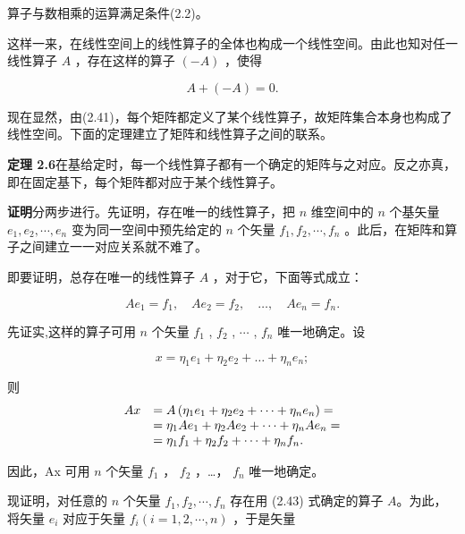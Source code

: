 算子与数相乘的运算满足条件(2.2)。

这样一来，在线性空间上的线性算子的全体也构成一个线性空间。由此也知对任一线性算子 $A$ ，存在这样的算子 $(-A)$ ，使得

\begin{equation*}
A + (- A) = 0.
\end{equation*}

现在显然，由(2.41)，每个矩阵都定义了某个线性算子，故矩阵集合本身也构成了线性空间。下面的定理建立了矩阵和线性算子之间的联系。

\textbf{定理 2.6}\quad 在基给定时，每一个线性算子都有一个确定的矩阵与之对应。反之亦真，即在固定基下，每个矩阵都对应于某个线性算子。

\textbf{证明}\quad 分两步进行。先证明，存在唯一的线性算子，把 $n$ 维空间中的 $n$ 个基矢量 $e_1, e_2, \cdots, e_n$ 变为同一空间中预先给定的 $n$ 个矢量 $f_1, f_2, \cdots, f_n$ 。此后，在矩阵和算子之间建立一一对应关系就不难了。

即要证明，总存在唯一的线性算子 $A$ ，对于它，下面等式成立：

\begin{equation*}
A e _ {1} = f _ {1}, \quad A e _ {2} = f _ {2}, \quad \dots , \quad A e _ {n} = f _ {n}.\tag{2.43}
\end{equation*}

先证实,这样的算子可用 $n$ 个矢量 $f_{1}$ , $f_{2}$ , $\cdots$ , $f_{n}$ 唯一地确定。设

\begin{equation*}
x = \eta_ {1} e _ {1} + \eta_ {2} e _ {2} + \dots + \eta_ {n} e _ {n};
\end{equation*}

则
\begin{equation*}
\begin{array}{r l} A x & = A \left(\eta_ {1} e _ {1} + \eta_ {2} e _ {2} + \dots + \eta_ {n} e _ {n}\right) = \\ & = \eta_ {1} A e _ {1} + \eta_ {2} A e _ {2} + \dots + \eta_ {n} A e _ {n} = \\ & = \eta_ {1} f _ {1} + \eta_ {2} f _ {2} + \dots + \eta_ {n} f _ {n}. \end{array}
\end{equation*}

因此，Ax 可用 $n$ 个矢量 $f_{1}$ ， $f_{2}$ ，…， $f_{n}$ 唯一地确定。

现证明，对任意的 $n$ 个矢量 $f_{1}, f_{2}, \cdots, f_{n}$ 存在用 (2.43) 式确定的算子 $A$。为此，将矢量 $e_{i}$ 对应于矢量 $f_{i} (i = 1, 2, \cdots, n)$ ，于是矢量

